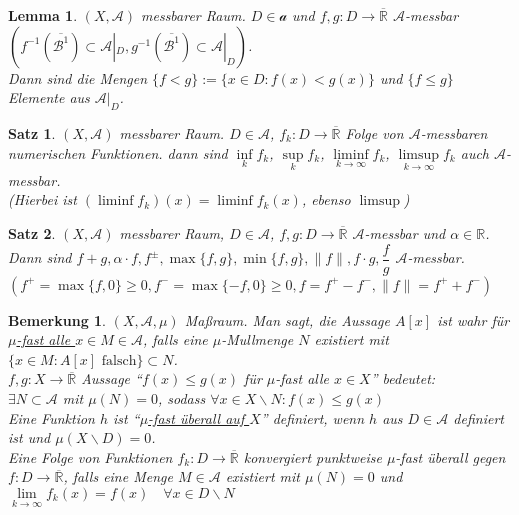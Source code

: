 \documentclass[11pt]{memoir}
\theoremstyle{changebreak}
\newtheorem{Bemerkung}{Bemerkung}[chapter]
\newtheorem{Lemma}{Lemma}[chapter]
\newtheorem{Satz}{Satz}[chapter]
\newcommand{\quotes}[1]{``#1''}
\begin{document}
\begin{Lemma}
$(X, \mathscr A)$ messbarer Raum. $D \in \mathscr a$ und $f, g: D \rightarrow \overline{\mathbb R }$ $\mathscr A$-messbar \\
$ \left( f^{-1}(\overline{\mathscr{B}^1}) \subset \mathscr A |_D, g^{-1}(\overline{\mathscr{B}^1}) \subset \mathscr A |_D\right)$. \\ Dann sind die Mengen $\{f < g\}:= \{x \in D: f(x) < g(x)\}$ und $\{f \leq g\}$ Elemente aus $\mathscr A |_D$.
\end{Lemma}

\begin{Satz}
$(X, \mathscr A)$ messbarer Raum. $D \in \mathscr A$, $f_k: D \rightarrow \overline{\mathbb R}$ Folge von $\mathscr A$-messbaren numerischen Funktionen. dann sind $\inf\limits_k f_k$, $\sup\limits_k f_k$, $\liminf\limits_{k\rightarrow \infty} f_k$, $\limsup\limits_{k \rightarrow \infty} f_k$ auch $\mathscr A$-messbar. \\
(Hierbei ist $(\liminf f_k)(x) = \liminf f_k(x)$, ebenso $\limsup$)
\end{Satz}

\begin{Satz}
$(X, \mathscr A)$ messbarer Raum, $D \in \mathscr A$, $f, g: D \rightarrow \overline{\mathbb R }$ $\mathscr A$-messbar und $\alpha \in \mathbb R$. Dann sind $f+g, \alpha \cdotp f, f^\pm, \max{\{f, g\}}, \min{\{f, g\}}, \|f\|, f \cdotp g, \dfrac{f}{g}$ $\mathscr A$-messbar. \\
$\left( f^+ = \max{\{f, 0\}} \geq 0, f^- = \max{\{-f, 0\}} \geq 0, f = f^+ - f^-, \|f\| = f^+ + f^- \right)$
\end{Satz}

\begin{Bemerkung}
$(X, \mathscr A, \mu)$ Maßraum. Man sagt, die Aussage $A[x]$ ist wahr für \underline{$\mu$-fast alle $x \in M \in \mathscr A$}, falls eine $\mu$-Mullmenge $N$ existiert mit $\{x \in M: A[x]  \text{ falsch}\} \subset N$.\\
$f, g: X \rightarrow \overline{\mathbb R}$ Aussage  \quotes{$f(x) \leq g(x)$ für $\mu$-fast alle $x \in X$}  bedeutet: \\
$\exists N \subset \mathscr A$ mit $\mu(N) = 0$, sodass $\forall x \in X\backslash N: f(x) \leq g(x)$ \\
Eine Funktion $h$ ist \quotes{\underline{$\mu$-fast überall auf $X$}} definiert, wenn $h$ aus $D \in \mathscr A$ definiert ist und $\mu(X \backslash D) = 0$. \\
Eine Folge von Funktionen $f_k: D \rightarrow \overline{\mathbb R}$ konvergiert punktweise $\mu$-fast überall gegen $f: D \rightarrow \overline{\mathbb R}$, falls eine Menge $M \in \mathscr A$ existiert mit $\mu(N) = 0$ und $\lim\limits_ {k \rightarrow \infty} f_k(x) = f(x)\quad \forall x \in D \backslash N$
\end{Bemerkung}
\end{document}
